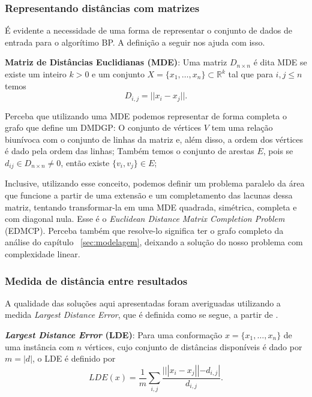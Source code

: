 \documentclass[a4paper,12pt]{article}
\begin{document}
	 \subsubsection{Representando distâncias com matrizes}
	 É evidente a necessidade de uma forma de representar o conjunto de dados de entrada para o algorítimo BP. A definição a seguir nos ajuda com isso.
	 
	 \begin{center}
	 	\begin{minipage}{0.9 \linewidth}
	 		\textbf{Matriz de Distâncias Euclidianas (MDE)}: Uma matriz $D_{n \times n}$ é dita MDE se existe um inteiro $k>0$ e um conjunto $X=\{x_1, \dots, x_n\} \subset \mathbb{R}^k$ tal que para $i,j \leq n$ temos
	 		$$D_{i,j}  =||x_i - x_j||.$$
	 	\end{minipage}
	 \end{center}
	 
	 Perceba que utilizando uma MDE podemos representar de forma completa o grafo que define um DMDGP: O conjunto de vértices $V$ tem uma relação biunívoca com o conjunto de linhas da matriz e, além disso, a ordem dos vértices é dado pela ordem das linhas; Também temos o conjunto de arestas $E$, pois se $d_{ij} \in D_{n\times n} \neq 0$, então existe $\{v_i, v_j\} \in E$;
	 
	 Inclusive, utilizando esse conceito, podemos definir um problema paralelo da área \cite{fidalgotese} que funcione a partir de uma extensão e um completamento das lacunas dessa matriz, tentando transformar-la em uma MDE quadrada, simétrica, completa e com diagonal nula. Esse é o \textit{Euclidean Distance Matrix Completion Problem} (EDMCP). Perceba também que resolve-lo significa ter o grafo completo da análise do capítulo ~\ref{sec:modelagem}, deixando a solução do nosso problema com complexidade linear.
	 
	 \subsubsection{Medida de distância entre resultados}
	 A qualidade das soluções aqui apresentadas foram averiguadas utilizando a medida \textit{Largest Distance Error}, que é definida como se segue, a partir de \cite{mucherino:BP}.
	 
	 \begin{center}
	 	\begin{minipage}{0.9 \linewidth}
	 		\textbf{\textit{Largest Distance Error} (LDE)}: Para uma conformação $x = \{x_1, \dots, x_n\}$ de uma instância com $n$ vértices, cujo conjunto de distâncias disponíveis é dado por $m = |d|$, o LDE é definido por  
	 		$$LDE(x) = \frac{1}{m} \sum_{i,j}^{}\frac{|||x_i - x_j|| - d_{i,j}|}{d_{i,j}} .$$
	 	\end{minipage}
	 \end{center}
	
\end{document}
